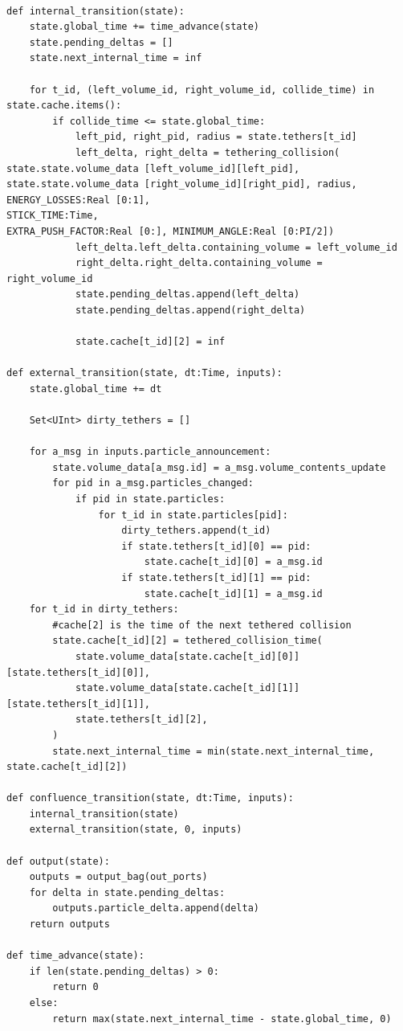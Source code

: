 \documentclass[conference]{IEEEtran}
\begin{document}
\begin{lstlisting}[style=Python]
	
def internal_transition(state):
	state.global_time += time_advance(state)
	state.pending_deltas = []
	state.next_internal_time = inf
	
	for t_id, (left_volume_id, right_volume_id, collide_time) in state.cache.items():
		if collide_time <= state.global_time:
			left_pid, right_pid, radius = state.tethers[t_id]
			left_delta, right_delta = tethering_collision( state.state.volume_data [left_volume_id][left_pid], state.state.volume_data [right_volume_id][right_pid], radius, ENERGY_LOSSES:Real [0:1],
STICK_TIME:Time,
EXTRA_PUSH_FACTOR:Real [0:], MINIMUM_ANGLE:Real [0:PI/2])
			left_delta.left_delta.containing_volume = left_volume_id
			right_delta.right_delta.containing_volume = right_volume_id
			state.pending_deltas.append(left_delta)
			state.pending_deltas.append(right_delta)
			
			state.cache[t_id][2] = inf
			
def external_transition(state, dt:Time, inputs):
	state.global_time += dt
	
	Set<UInt> dirty_tethers = []
	
	for a_msg in inputs.particle_announcement:
		state.volume_data[a_msg.id] = a_msg.volume_contents_update
		for pid in a_msg.particles_changed:
			if pid in state.particles:
				for t_id in state.particles[pid]:
					dirty_tethers.append(t_id)
					if state.tethers[t_id][0] == pid:
						state.cache[t_id][0] = a_msg.id
					if state.tethers[t_id][1] == pid:
						state.cache[t_id][1] = a_msg.id
	for t_id in dirty_tethers:
		#cache[2] is the time of the next tethered collision
		state.cache[t_id][2] = tethered_collision_time( 
			state.volume_data[state.cache[t_id][0]] [state.tethers[t_id][0]],
			state.volume_data[state.cache[t_id][1]] [state.tethers[t_id][1]],
			state.tethers[t_id][2],
		)
		state.next_internal_time = min(state.next_internal_time, state.cache[t_id][2])
	
def confluence_transition(state, dt:Time, inputs):
	internal_transition(state)
	external_transition(state, 0, inputs)
	
def output(state):
	outputs = output_bag(out_ports)
	for delta in state.pending_deltas:
		outputs.particle_delta.append(delta)
	return outputs
	
def time_advance(state):
	if len(state.pending_deltas) > 0:
		return 0
	else:
		return max(state.next_internal_time - state.global_time, 0)
	
\end{lstlisting}
\end{document}
